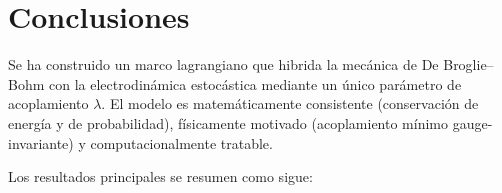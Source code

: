 \documentclass[11pt,a4paper]{article}
\begin{document}
\section{Conclusiones}
\label{sec:conclusiones}

Se ha construido un marco lagrangiano que hibrida la mecánica de
De Broglie--Bohm con la electrodinámica estocástica mediante un único
parámetro de acoplamiento $\lambda$. El modelo es matemáticamente
consistente (conservación de energía y de probabilidad), físicamente
motivado (acoplamiento mínimo gauge-invariante) y computacionalmente
tratable.

Los resultados principales se resumen como sigue:
\end{document}
